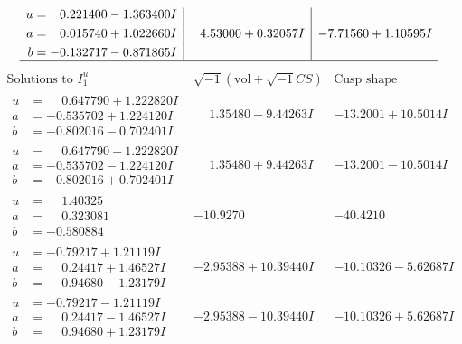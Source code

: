 \documentclass[1p]{elsarticle_modified}
\theoremstyle{definition}
\newcommand{\I}{\sqrt{-1}}
\begin{document}
$$\begin{array}{c|c|c}
\begin{aligned}
u &= \phantom{-}0.221400 - 1.363400 I \\
a &= \phantom{-}0.015740 + 1.022660 I \\
b &= -0.132717 - 0.871865 I\end{aligned}
 & \phantom{-}4.53000 + 0.32057 I & -7.71560 + 1.10595 I\\
 \hline 
 \end{array}$$\newpage$$\begin{array}{c|c|c}  
\text{Solutions to }I^u_{1}& \I (\text{vol} + \sqrt{-1}CS) & \text{Cusp shape}\\
 \hline 
\begin{aligned}
u &= \phantom{-}0.647790 + 1.222820 I \\
a &= -0.535702 + 1.224120 I \\
b &= -0.802016 - 0.702401 I\end{aligned}
 & \phantom{-}1.35480 - 9.44263 I & -13.2001 + 10.5014 I \\ \hline\begin{aligned}
u &= \phantom{-}0.647790 - 1.222820 I \\
a &= -0.535702 - 1.224120 I \\
b &= -0.802016 + 0.702401 I\end{aligned}
 & \phantom{-}1.35480 + 9.44263 I & -13.2001 - 10.5014 I \\ \hline\begin{aligned}
u &= \phantom{-}1.40325\phantom{ +0.000000I} \\
a &= \phantom{-}0.323081\phantom{ +0.000000I} \\
b &= -0.580884\phantom{ +0.000000I}\end{aligned}
 & -10.9270\phantom{ +0.000000I} & -40.4210\phantom{ +0.000000I} \\ \hline\begin{aligned}
u &= -0.79217 + 1.21119 I \\
a &= \phantom{-}0.24417 + 1.46527 I \\
b &= \phantom{-}0.94680 - 1.23179 I\end{aligned}
 & -2.95388 + 10.39440 I & -10.10326 - 5.62687 I \\ \hline\begin{aligned}
u &= -0.79217 - 1.21119 I \\
a &= \phantom{-}0.24417 - 1.46527 I \\
b &= \phantom{-}0.94680 + 1.23179 I\end{aligned}
 & -2.95388 - 10.39440 I & -10.10326 + 5.62687 I \\ \hline\begin{aligned}

\end{aligned}
\end{array}$$
\end{document}
